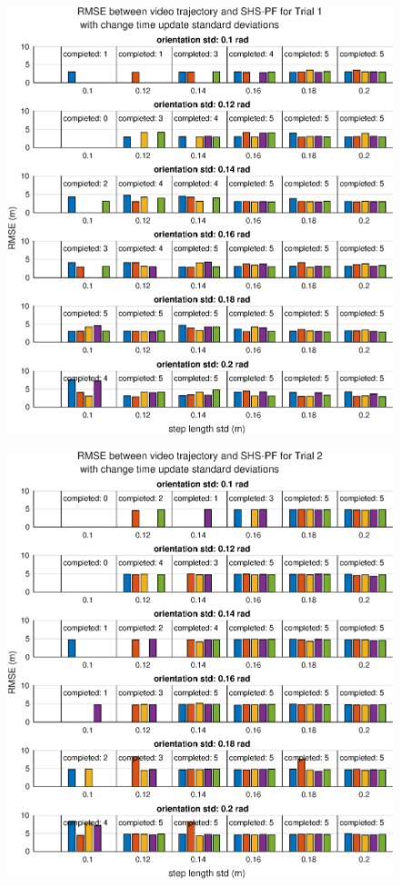 \begin{figure}[H]
	\centering
	\includegraphics[width=0.6\linewidth]{images/20201201_0951_RMSE_between_video_trajectory_and_SHS-PF_for_Trial_1_1}
		\setlength{\belowcaptionskip}{-20pt}
	\caption{}
	\label{fig:202012010951rmsebetweenvideotrajectoryandshs-pffortrial11}
\end{figure}
\begin{figure}[H]
	\centering
	\includegraphics[width=0.6\linewidth]{images/20201201_0951_RMSE_between_video_trajectory_and_SHS-PF_for_Trial_2_1}
	\setlength{\belowcaptionskip}{-20pt}
	\caption{}
	\label{fig:202012010951rmsebetweenvideotrajectoryandshs-pffortrial21}
\end{figure}
